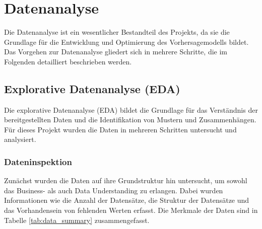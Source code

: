 \documentclass[%
pdftex,
oneside,			%
11pt,				%
parskip=half,		%
headheight = 12pt,	%
headsepline,		%
footsepline,		%
footheight = 16pt,	%
abstracton,		%
DIV=calc,		%
BCOR=8mm,		%
headinclude=false,	%
footinclude=false,	%
listof=totoc,		%
toc=bibliography,	%
]{scrreprt}	%
\begin{document}
\chapter{Datenanalyse}
        
        Die Datenanalyse ist ein wesentlicher Bestandteil des Projekts, da sie die Grundlage für die Entwicklung und Optimierung des Vorhersagemodells bildet. 
        Das Vorgehen zur Datenanalyse gliedert sich in mehrere Schritte, die im Folgenden detailliert beschrieben werden.

    \section{Explorative Datenanalyse (EDA)}

        Die explorative Datenanalyse (EDA) bildet die Grundlage für das Verständnis der bereitgestellten Daten und die Identifikation von Mustern und Zusammenhängen. 
        Für dieses Projekt wurden die Daten in mehreren Schritten untersucht und analysiert.

        \subsection{Dateninspektion}
            \label{sec:dateninspektion}

            Zunächst wurden die Daten auf ihre Grundstruktur hin untersucht, um sowohl das Business- als auch Data Understanding zu erlangen. 
            Dabei wurden Informationen wie die Anzahl der Datensätze, die Struktur der Datensätze und das Vorhandensein von fehlenden Werten erfasst. 
            Die Merkmale der Daten sind in Tabelle \ref{tab:data_summary} zusammengefasst.
\end{document}
